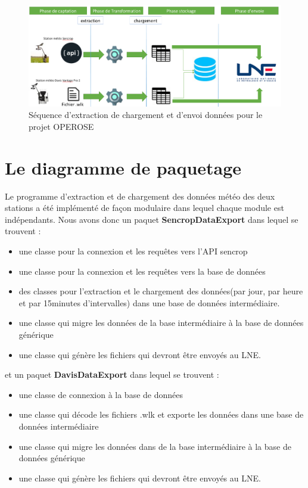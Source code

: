 \begin{figure}[!h]
    \centering
     \includegraphics[width=1\textwidth]{images/processusOperose.png}
     \caption{ Séquence d'extraction de chargement et d'envoi données pour le projet OPEROSE}
     \label{gig : Diagremme de séquence extraction et chargement}
\end{figure}

\section{Le diagramme de paquetage}
Le programme d'extraction et de chargement des données météo des deux stations a été implémenté de façon modulaire dans lequel chaque module est indépendants. Nous avons donc un paquet \textbf{SencropDataExport} dans lequel se trouvent :
\begin{itemize}
    \item une classe pour la connexion et les requêtes vers l'API sencrop
    \item une classe pour la connexion et les requêtes vers la base de données
    \item des classes pour l'extraction et le chargement des données(par jour, par heure et par 15minutes d'intervalles) dans une base de données intermédiaire.
    \item une classe qui migre les données de la base intermédiaire à la base de données générique
    \item une classe qui génère les fichiers qui devront être envoyés au LNE.
\end{itemize}
et un paquet \textbf{DavisDataExport} dans lequel se trouvent : 
\begin{itemize}
    \item une classe de connexion à la base de données
    \item une classe qui décode les fichiers .wlk  et exporte les données dans une base de données intermédiaire
    \item une classe qui migre les données dans de la base intermédiaire à la base de données générique
    \item une classe qui génère les fichiers qui devront être envoyés au LNE.
\end{itemize}

